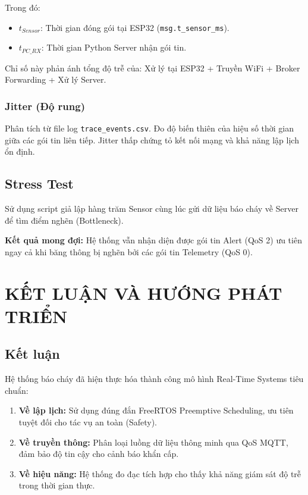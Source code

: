 \documentclass[12pt,a4paper]{report}
\begin{document}
Trong đó:
\begin{itemize}
    \item $t_{Sensor}$: Thời gian đóng gói tại ESP32 (\texttt{msg.t\_sensor\_ms}).
    \item $t_{PC\_RX}$: Thời gian Python Server nhận gói tin.
\end{itemize}

Chỉ số này phản ánh tổng độ trễ của: Xử lý tại ESP32 + Truyền WiFi + Broker Forwarding + Xử lý Server.

\subsection{Jitter (Độ rung)}
Phân tích từ file log \texttt{trace\_events.csv}. Đo độ biến thiên của hiệu số thời gian giữa các gói tin liên tiếp. Jitter thấp chứng tỏ kết nối mạng và khả năng lập lịch ổn định.

\section{Stress Test}
Sử dụng script giả lập hàng trăm Sensor cùng lúc gửi dữ liệu báo cháy về Server để tìm điểm nghẽn (Bottleneck).

\textbf{Kết quả mong đợi:} Hệ thống vẫn nhận diện được gói tin Alert (QoS 2) ưu tiên ngay cả khi băng thông bị nghẽn bởi các gói tin Telemetry (QoS 0).

\chapter*{KẾT LUẬN VÀ HƯỚNG PHÁT TRIỂN}

\section*{Kết luận}
Hệ thống báo cháy đã hiện thực hóa thành công mô hình Real-Time Systems tiêu chuẩn:
\begin{enumerate}
    \item \textbf{Về lập lịch:} Sử dụng đúng đắn FreeRTOS Preemptive Scheduling, ưu tiên tuyệt đối cho tác vụ an toàn (Safety).
    \item \textbf{Về truyền thông:} Phân loại luồng dữ liệu thông minh qua QoS MQTT, đảm bảo độ tin cậy cho cảnh báo khẩn cấp.
    \item \textbf{Về hiệu năng:} Hệ thống đo đạc tích hợp cho thấy khả năng giám sát độ trễ trong thời gian thực.
\end{enumerate}
\end{document}
